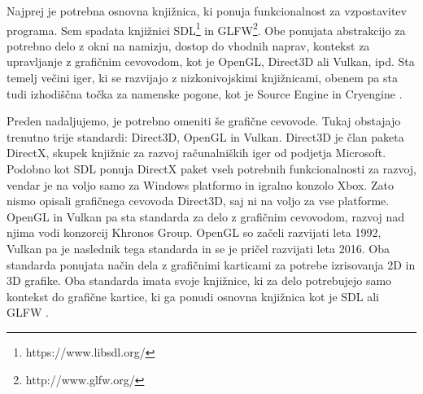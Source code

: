 \documentclass[12pt,a4paper,twoside]{book}
\begin{document}
Najprej je potrebna osnovna knjižnica, ki ponuja funkcionalnost za vzpostavitev programa. Sem spadata knjižnici SDL\footnote{https://www.libsdl.org/}\cite{sdllib} in GLFW\footnote{http://www.glfw.org/}\cite{glfw}. Obe ponujata abstrakcijo za potrebno delo z okni na namizju, dostop do vhodnih naprav, kontekst za upravljanje z grafičnim cevovodom, kot je OpenGL, Direct3D ali Vulkan, ipd. Sta temelj večini iger, ki se razvijajo z nizkonivojskimi knjižnicami, obenem pa sta tudi izhodiščna točka za namenske pogone, kot je Source Engine \cite{sourceEngineSDL} in Cryengine \cite{cryengineSDL}.

Preden nadaljujemo, je potrebno omeniti še grafične cevovode. Tukaj obstajajo trenutno trije standardi: Direct3D, OpenGL in Vulkan. Direct3D je član paketa DirectX, skupek knjižnic za razvoj računalniških iger od podjetja Microsoft. Podobno kot SDL ponuja DirectX paket vseh potrebnih funkcionalnosti za razvoj, vendar je na voljo samo za Windows platformo in igralno konzolo Xbox. Zato nismo opisali grafičnega cevovoda Direct3D, saj ni na voljo za vse platforme. OpenGL in Vulkan pa sta standarda za delo z grafičnim cevovodom, razvoj nad njima vodi konzorcij Khronos Group. OpenGL so začeli razvijati leta 1992, Vulkan pa je naslednik tega standarda in se je pričel razvijati leta 2016. Oba standarda ponujata način dela z grafičnimi karticami za potrebe izrisovanja 2D in 3D grafike. Oba standarda imata svoje knjižnice, ki za delo potrebujejo samo kontekst do grafične kartice, ki ga ponudi osnovna knjižnica kot je SDL ali GLFW \cite{opengl}. 
\end{document}
